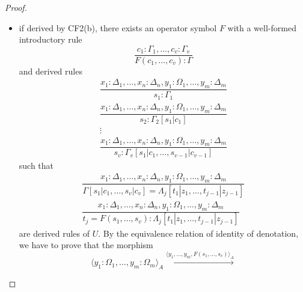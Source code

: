 \begin{proof}
\begin{itemize}
        \item if derived by CF2(b), there exists an operator symbol
            $F$ with a well-formed introductory rule 
            \begin{equation*}
            \dfrac{
                c_1 : \Gamma_1, \dots, c_v : \Gamma_v
            }{
                F(c_1, \dots, c_v) : \Gamma
            }
            \end{equation*}
            and derived rules
            \begin{align*}
                \dfrac{
                    x_1 : \Delta_1, \dots, x_n : \Delta_n,
                    y_1 : \Omega_1, \dots, y_m : \Delta_m
                }{
                    s_1 : \Gamma_1
                } \\
                \dfrac{
                    x_1 : \Delta_1, \dots, x_n : \Delta_n,
                    y_1 : \Omega_1, \dots, y_m : \Delta_m
                }{
                    s_2 : \Gamma_2[s_1 | c_1]
                } \\
                \vdots \\
                \dfrac{
                    x_1 : \Delta_1, \dots, x_n : \Delta_n,
                    y_1 : \Omega_1, \dots, y_m : \Delta_m
                }{
                    s_v : \Gamma_v[s_1 | c_1, \dots, s_{v-1} | c_{v-1}]
                }
            \end{align*}
            such that 
            \begin{align*}
                \dfrac{
                    x_1 : \Delta_1, \dots, x_n : \Delta_n,
                    y_1 : \Omega_1, \dots, y_m : \Delta_m
                }{
                    \Gamma[s_1 | c_1, \dots, s_v | c_v] 
                    = \Lambda_j[t_1 | z_1, \dots, t_{j-1} | z_{j-1}]
                } \\
                \dfrac{
                    x_1 : \Delta_1, \dots, x_n : \Delta_n,
                    y_1 : \Omega_1, \dots, y_m : \Delta_m
                }{
                    t_j = F(s_1, \dots, s_v) : \Lambda_j[t_1 | z_1, \dots, t_{j-1} | z_{j-1}]
                }
            \end{align*}
            are derived rules of $U$.
            By the equivalence relation of identity of denotation,
            we have to prove that the morphism
            \begin{equation*} %
                \langle y_1 : \Omega_1, \dots, y_m : \Omega_m \rangle_A
                \xrightarrow{\langle y_1, \dots, y_m, F(s_1, \dots, s_v) \rangle_A}

\end{equation*}
\end{itemize}
\end{proof}
